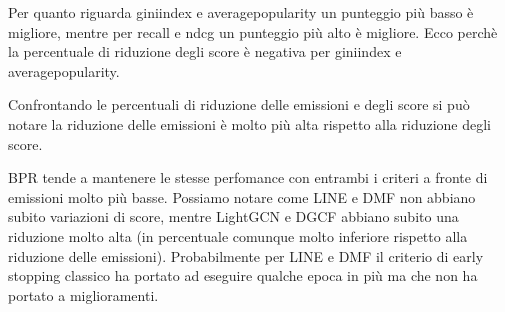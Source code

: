 \noindent Per quanto riguarda giniindex e averagepopularity un punteggio più basso è migliore, mentre per recall e ndcg un punteggio più alto è migliore.
Ecco perchè la percentuale di riduzione degli score è negativa per giniindex e averagepopularity.

\noindent Confrontando le percentuali di riduzione delle emissioni e degli score si può notare la riduzione delle emissioni è molto più alta rispetto alla riduzione degli score.

\noindent BPR tende a mantenere le stesse perfomance con entrambi i criteri a fronte di emissioni molto più basse.
Possiamo notare come LINE e DMF non abbiano subito variazioni di score, mentre LightGCN e DGCF abbiano subito una riduzione molto alta (in percentuale comunque molto inferiore rispetto alla riduzione delle emissioni).
Probabilmente per LINE e DMF il criterio di early stopping classico ha portato ad eseguire qualche epoca in più ma che non ha portato a miglioramenti.

